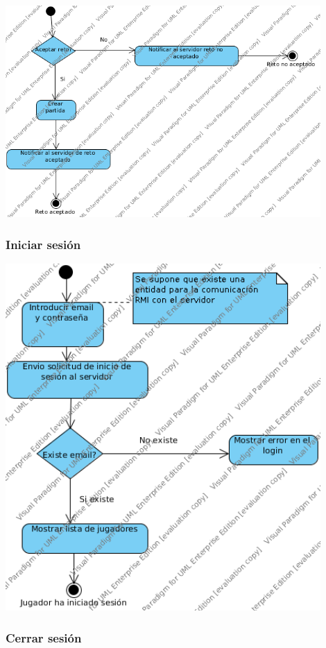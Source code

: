 \documentclass[a4paper,11pt,oneside]{article}
\begin{document}
\includegraphics[width=0.9\textwidth]{img/ms_aceptarRetoCliente.png}\\[1cm]

\subsubsection{Iniciar sesión}

\includegraphics[width=0.9\textwidth]{img/ms_IniciarSesionCliente.png}\\[1cm]


\subsubsection{Cerrar sesión}
\end{document}
